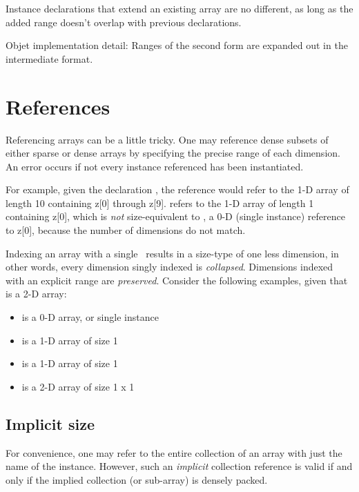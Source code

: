 Instance declarations that extend an existing array are no different, 
as long as the added range doesn't overlap with previous declarations.  

Objet implementation detail:
Ranges of the second form are expanded out in the intermediate format.  

\section{References}
\label{sec:arrays:references}

Referencing arrays can be a little tricky.  
One may reference dense subsets of either sparse or dense arrays
by specifying the precise range of each dimension.  
An error occurs if not every instance referenced has been instantiated.  

For example, given the declaration , 
the reference  would refer to the
1-D array of length 10 containing z[0] through z[9].  
 refers to the 1-D array of length 1 containing z[0], 
which is \emph{not} size-equivalent to , 
a 0-D (single instance) reference to z[0], 
because the number of dimensions do not match.  

Indexing an array with a single \pint\ results in a size-type of one less
dimension, in other words, every dimension singly indexed is \emph{collapsed}.  
Dimensions indexed with an explicit range are \emph{preserved}.  
Consider the following examples, given that  is a 2-D array:
\begin{itemize}
\item {} is a 0-D array, or single instance
\item {} is a 1-D array of size 1
\item {} is a 1-D array of size 1
\item {} is a 2-D array of size 1 x 1
\end{itemize}

\subsection{Implicit size}
\label{sec:arrays:references:implicit}

For convenience, one may refer to the entire collection
of an array with just the name of the instance.  
However, such an \emph{implicit} collection reference is valid
if and only if the implied collection (or sub-array) is densely packed.  

